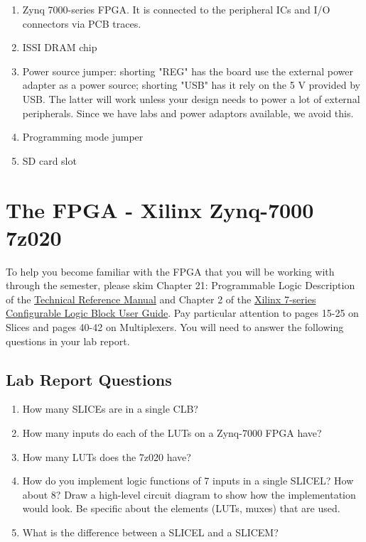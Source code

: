 \documentclass[11pt]{article}
\begin{document}
\begin{enumerate}
  \item Zynq 7000-series FPGA. It is connected to the peripheral ICs and I/O connectors via PCB traces.
  \item ISSI DRAM chip
  \item Power source jumper: shorting "REG" has the board use the external power adapter as a power source; shorting "USB" has it rely on the 5 V provided by USB. The latter will work unless your design needs to power a lot of external peripherals. Since we have labs and power adaptors available, we avoid this.
  \item Programming mode jumper
  \item SD card slot
\end{enumerate}

\section{The FPGA - Xilinx Zynq-7000 7z020}
To help you become familiar with the FPGA that you will be working with through the semester, please skim Chapter 21: Programmable Logic Description of the \href{https://www.xilinx.com/support/documentation/user_guides/ug585-Zynq-7000-TRM.pdf}{Technical Reference Manual} and Chapter 2 of the \href{http://www.xilinx.com/support/documentation/user_guides/ug474_7Series_CLB.pdf}{Xilinx 7-series Configurable Logic Block User Guide}.
Pay particular attention to pages 15-25 on Slices and pages 40-42 on Multiplexers.
You will need to answer the following questions in your lab report.

\subsection{Lab Report Questions}\label{sec:checkoffQuestions}
\begin{enumerate}
  \item How many SLICEs are in a single CLB?
  \item How many inputs do each of the LUTs on a Zynq-7000 FPGA have?
  \item How many LUTs does the 7z020 have?
\item How do you implement logic functions of 7 inputs in a single SLICEL? How about 8? Draw a high-level circuit diagram to show how the implementation would look. Be specific about the elements (LUTs, muxes) that are used.
  \item What is the difference between a SLICEL and a SLICEM?
\end{enumerate}
\end{document}

